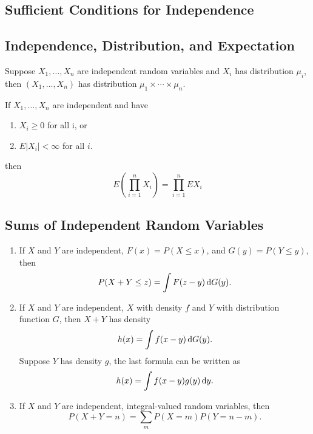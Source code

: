 \subsection{Sufficient Conditions for Independence}

\subsection{Independence, Distribution, and Expectation}

\begin{theorem}
	Suppose $X_{1},\ldots,X_{n}$ are independent random variables and $X_{i}$ has distribution $\mu_{i}$, then $\left(X_{1},\ldots,X_{n}\right)$ has distribution $\mu_{1}\times\cdots\times\mu_{n}$.
\end{theorem}

\begin{theorem}
	If $X_{1},\ldots,X_{n}$ are independent and have
	\begin{enumerate}
		\item $X_{i} \geq 0$ for all i, or
		\item $E\left|X_{i}\right|<\infty$ for all $i$.
	\end{enumerate}
	then
	\begin{equation}
		E\left(\prod_{i=1}^{n}X_{i}\right)=\prod_{i=1}^{n}EX_{i}
	\end{equation}
\end{theorem}

\subsection{Sums of Independent Random Variables}

\begin{theorem}
	\begin{enumerate}
		\item If $X$ and $Y$ are independent, $F(x)=P(X\leq x)$, and $G(y)=P(Y\leq y)$, then
		      \begin{equation}
			      P(X+Y\leq z)=\int F(z-y)\mathop{}\!\mathrm{d} G(y).
		      \end{equation}
		\item If $X$ and $Y$ are independent,  $X$ with density $f$ and $Y$ with distribution function $G$, then $X+Y$ has density
		      \begin{equation}
			      h(x)=\int f(x-y)\mathop{}\!\mathrm{d} G(y).
		      \end{equation}
		      Suppose $Y$ has density $g$, the last formula can be written as
		      \begin{equation}
			      h(x)=\int f(x-y)g(y)\mathop{}\!\mathrm{d} y.
		      \end{equation}
		\item If $X$ and $Y$ are independent, integral-valued random variables, then
		      \begin{equation}
			      P(X+Y=n)=\sum_{m}P(X=m)P(Y=n-m).
		      \end{equation}
	\end{enumerate}
\end{theorem}

